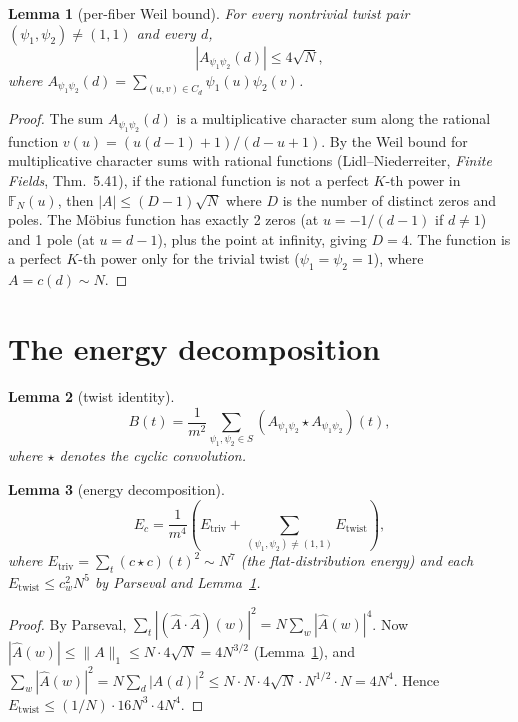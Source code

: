 \documentclass[11pt]{article}
\newtheorem{lemma}{Lemma}[section]
\begin{document}
\begin{lemma}[per-fiber Weil bound]\label{lem:fiberweil}
For every nontrivial twist pair $(\psi_1,\psi_2) \neq (1,1)$ and every
$d$,
\[
  |A_{\psi_1\psi_2}(d)| \le 4\sqrt{N},
\]
where $A_{\psi_1\psi_2}(d) = \sum_{(u,v) \in C_d} \psi_1(u)\psi_2(v)$.
\end{lemma}

\begin{proof}
The sum $A_{\psi_1\psi_2}(d)$ is a multiplicative character sum along
the rational function $v(u) = (u(d{-}1)+1)/(d{-}u+1)$.  By the Weil
bound for multiplicative character sums with rational functions
(Lidl--Niederreiter, \emph{Finite Fields}, Thm.~5.41), if the rational
function is not a perfect $K$-th power in $\mathbb{F}_N(u)$, then
$|A| \le (D{-}1)\sqrt{N}$ where $D$ is the number of distinct zeros
and poles.  The M\"obius function has exactly 2 zeros (at
$u = -1/(d{-}1)$ if $d \neq 1$) and 1 pole (at $u = d{-}1$), plus the
point at infinity, giving $D = 4$.  The function is a perfect $K$-th
power only for the trivial twist ($\psi_1 = \psi_2 = 1$), where
$A = c(d) \sim N$.
\end{proof}

\section{The energy decomposition}

\begin{lemma}[twist identity]\label{lem:twist}
\[
  B(t) = \frac{1}{m^2}\sum_{\psi_1,\psi_2 \in S}
  (A_{\psi_1\psi_2} \star A_{\psi_1\psi_2})(t),
\]
where $\star$ denotes the cyclic convolution.
\end{lemma}

\begin{lemma}[energy decomposition]\label{lem:energy}
\[
  E_c = \frac{1}{m^4}\left(E_{\mathrm{triv}} +
  \sum_{(\psi_1,\psi_2) \neq (1,1)} E_{\mathrm{twist}}\right),
\]
where $E_{\mathrm{triv}} = \sum_t (c \star c)(t)^2 \sim N^7$ (the
flat-distribution energy) and each
$E_{\mathrm{twist}} \le c_w^2 N^5$ by Parseval and
Lemma~\ref{lem:fiberweil}.
\end{lemma}

\begin{proof}
By Parseval, $\sum_t |(\widehat{A} \cdot \widehat{A})(w)|^2
= N \sum_w |\widehat{A}(w)|^4$.  Now
$|\widehat{A}(w)| \le \|A\|_1 \le N \cdot 4\sqrt{N} = 4N^{3/2}$
(Lemma~\ref{lem:fiberweil}), and
$\sum_w |\widehat{A}(w)|^2 = N \sum_d |A(d)|^2 \le N \cdot N \cdot
4\sqrt{N} \cdot N^{1/2} \cdot N = 4N^4$.  Hence
$E_{\mathrm{twist}} \le (1/N) \cdot 16 N^3 \cdot 4N^4$.
\end{proof}
\end{document}
